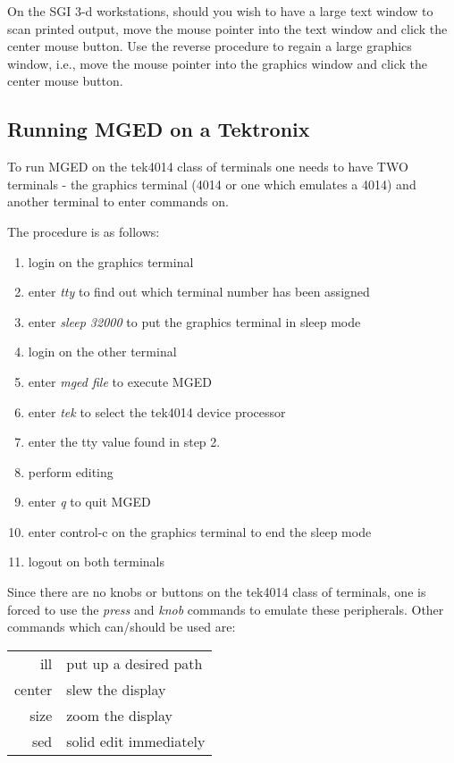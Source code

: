 On the SGI 3-d workstations,
should you wish to have a large text window to scan printed output, move
the mouse pointer into the text window and click the center mouse button.
Use the reverse procedure to regain a large graphics window, i.e.,
move the mouse pointer into the graphics window
and click the center mouse button.

\subsection{Running MGED on a Tektronix}

To run MGED on the tek4014 class of terminals one needs to have TWO
terminals - the graphics terminal (4014 or one which emulates a 4014) and
another terminal to enter commands on.

The procedure is as follows:
\begin{enumerate}
\item login on the graphics terminal
\item enter {\em tty} to find out which terminal number has been assigned
\item  enter {\em sleep 32000} to put the graphics terminal in sleep mode
\item  login on the other terminal
\item  enter {\em mged file} to execute MGED
\item  enter {\em tek} to select the tek4014 device processor
\item  enter the tty value found in step 2.
\item  perform editing
\item  enter {\em q} to quit MGED
\item  enter control-c on the graphics terminal to end the sleep mode
\item  logout on both terminals
\end{enumerate}

Since there are no knobs or buttons on the tek4014 class of terminals, one
is forced to use the {\em press} and {\em knob} commands to emulate these
peripherals.
Other commands which can/should be used are:

\begin{tabular}{rl}
ill     & put up a desired path \\
center  & slew the display \\
size    & zoom the display \\
sed     & solid edit immediately
\end{tabular}

